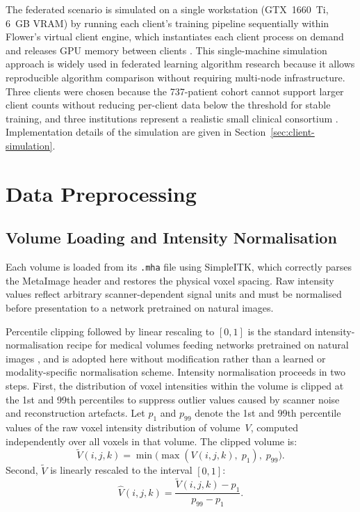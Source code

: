The federated scenario is simulated on a single workstation (GTX~1660~Ti,
6~GB VRAM) by running each client's training pipeline sequentially within
Flower's virtual client engine, which instantiates each client process on
demand and releases GPU memory between clients \cite{beutel2022flower}.
This single-machine simulation approach is widely used in federated learning
algorithm research because it allows reproducible algorithm comparison
without requiring multi-node infrastructure.
Three clients were chosen because the 737-patient cohort cannot support larger
client counts without reducing per-client data below the threshold for stable
training, and three institutions represent a realistic small clinical consortium
\cite{sheller2020federated,rieke2020future}.
Implementation details of the simulation are given in
Section~\ref{sec:client-simulation}.


\section{Data Preprocessing}
\label{sec:preprocessing}


\subsection{Volume Loading and Intensity Normalisation}
\label{sec:volume-loading}

Each volume is loaded from its \texttt{.mha} file using
SimpleITK, which correctly parses the MetaImage header and
restores the physical voxel spacing.
Raw intensity values reflect arbitrary scanner-dependent
signal units and must be normalised before presentation to
a network pretrained on natural images.

Percentile clipping followed by linear rescaling to $[0,1]$
is the standard intensity-normalisation recipe for medical
volumes feeding networks pretrained on natural images
\cite{litjens2017survey}, and is adopted here without
modification rather than a learned or modality-specific
normalisation scheme.
Intensity normalisation proceeds in two steps.
First, the distribution of voxel intensities within the
volume is clipped at the 1st and 99th percentiles to suppress
outlier values caused by scanner noise and reconstruction
artefacts.
Let $p_1$ and $p_{99}$ denote the 1st and 99th percentile
values of the raw voxel intensity distribution of
volume~$V$, computed independently over all voxels in
that volume.
The clipped volume is:
\begin{equation}
  \tilde{V}(i,j,k)
  = \min\bigl(\max(V(i,j,k),\; p_1),\; p_{99}\bigr).
  \label{eq:clipping}
\end{equation}
Second, $\tilde{V}$ is linearly rescaled to the interval
$[0, 1]$:
\begin{equation}
  \hat{V}(i,j,k)
  = \frac{\tilde{V}(i,j,k) - p_1}{p_{99} - p_1}.
  \label{eq:minmax}
\end{equation}


